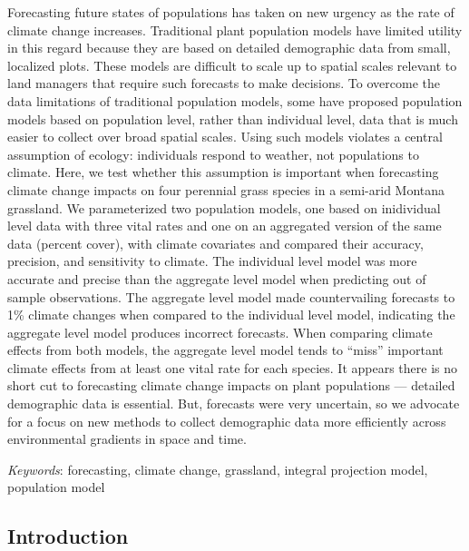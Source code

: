 \documentclass[12pt,]{article}
\begin{document}
Forecasting future states of populations has taken on new urgency as the
rate of climate change increases. Traditional plant population models
have limited utility in this regard because they are based on detailed
demographic data from small, localized plots. These models are difficult
to scale up to spatial scales relevant to land managers that require
such forecasts to make decisions. To overcome the data limitations of
traditional population models, some have proposed population models
based on population level, rather than individual level, data that is
much easier to collect over broad spatial scales. Using such models
violates a central assumption of ecology: individuals respond to
weather, not populations to climate. Here, we test whether this
assumption is important when forecasting climate change impacts on four
perennial grass species in a semi-arid Montana grassland. We
parameterized two population models, one based on inidividual level data
with three vital rates and one on an aggregated version of the same data
(percent cover), with climate covariates and compared their accuracy,
precision, and sensitivity to climate. The individual level model was
more accurate and precise than the aggregate level model when predicting
out of sample observations. The aggregate level model made
countervailing forecasts to 1\% climate changes when compared to the
individual level model, indicating the aggregate level model produces
incorrect forecasts. When comparing climate effects from both models,
the aggregate level model tends to ``miss'' important climate effects
from at least one vital rate for each species. It appears there is no
short cut to forecasting climate change impacts on plant populations ---
detailed demographic data is essential. But, forecasts were very
uncertain, so we advocate for a focus on new methods to collect
demographic data more efficiently across environmental gradients in
space and time.

\emph{Keywords}: forecasting, climate change, grassland, integral
projection model, population model

\subsection{Introduction}\label{introduction}
\end{document}
